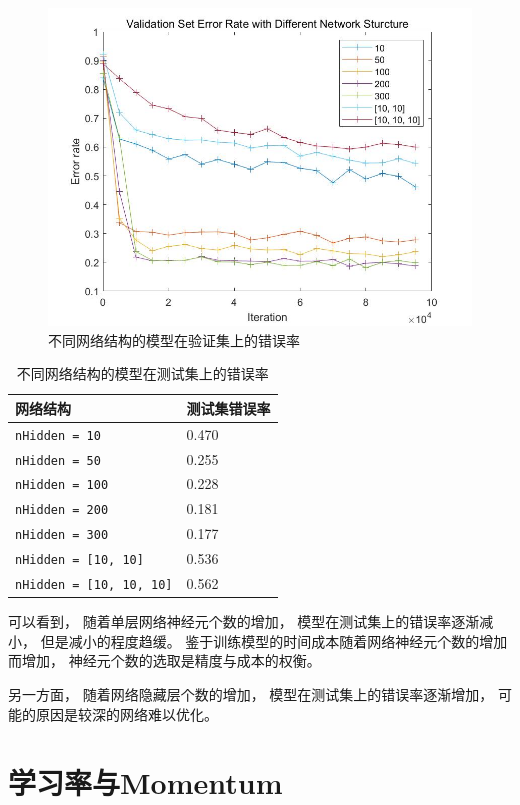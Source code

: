 \documentclass{article}
\begin{document}
\begin{figure}[h]
\includegraphics[width=\textwidth]{1.jpg}
\caption{不同网络结构的模型在验证集上的错误率}
\label{fig:1}
\end{figure}

\begin{table}[h]
\centering
\begin{tabular}{|l|l|} 
\hline
网络结构 & 测试集错误率 \\
\hline
\verb|nHidden = 10| & 0.470 \\
\verb|nHidden = 50| & 0.255 \\
\verb|nHidden = 100| & 0.228 \\
\verb|nHidden = 200| & 0.181 \\
\verb|nHidden = 300| & 0.177\\
\verb|nHidden = [10, 10]| & 0.536 \\
\verb|nHidden = [10, 10, 10]| & 0.562 \\
\hline
\end{tabular}
\caption{不同网络结构的模型在测试集上的错误率}
\label{table:1}
\end{table}

可以看到，
随着单层网络神经元个数的增加，
模型在测试集上的错误率逐渐减小，
但是减小的程度趋缓。
鉴于训练模型的时间成本随着网络神经元个数的增加而增加，
神经元个数的选取是精度与成本的权衡。

另一方面，
随着网络隐藏层个数的增加，
模型在测试集上的错误率逐渐增加，
可能的原因是较深的网络难以优化。

\section{学习率与Momentum}
\end{document}
